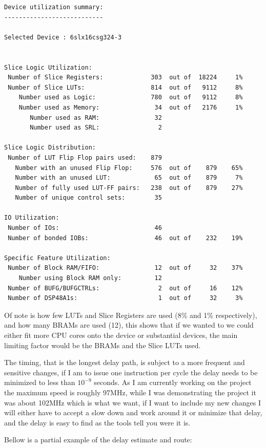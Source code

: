 \documentclass	[a4paper, 10pt]	{article}
\begin{document}
\begin{verbatim}
Device utilization summary:
---------------------------

Selected Device : 6slx16csg324-3 


Slice Logic Utilization: 
 Number of Slice Registers:             303  out of  18224     1%  
 Number of Slice LUTs:                  814  out of   9112     8%  
    Number used as Logic:               780  out of   9112     8%  
    Number used as Memory:               34  out of   2176     1%  
       Number used as RAM:               32
       Number used as SRL:                2

Slice Logic Distribution: 
 Number of LUT Flip Flop pairs used:    879
   Number with an unused Flip Flop:     576  out of    879    65%  
   Number with an unused LUT:            65  out of    879     7%  
   Number of fully used LUT-FF pairs:   238  out of    879    27%  
   Number of unique control sets:        35

IO Utilization: 
 Number of IOs:                          46
 Number of bonded IOBs:                  46  out of    232    19%  

Specific Feature Utilization:
 Number of Block RAM/FIFO:               12  out of     32    37%  
    Number using Block RAM only:         12
 Number of BUFG/BUFGCTRLs:                2  out of     16    12%  
 Number of DSP48A1s:                      1  out of     32     3%  
\end{verbatim}

  Of note is how few LUTs and Slice Registers are used (8\% and 1\% respectively), and how
  many BRAMs are used (12), this shows that if we wanted to we could either fit more CPU cores
  onto the device or substantial devices, the main limiting factor would be the BRAMs and
  the Slice LUTs used.

  The timing, that is the longest delay path, is subject to a more frequent and sensitive
  changes, if I am to issue one instruction per cycle the delay needs to be minimized to
  less than $10^{-9}$ seconds. As I am currently working on the project the maximum speed
  is roughly 97MHz, while I was demonstrating the project it was about 102MHz which is what
  we want, if I want to include my new changes I will either have to accept a slow down and
  work around it or minimize that delay, and the delay is easy to find as the tools tell you
  were it is.

  Bellow is a partial example of the delay estimate and route:
\end{document}
